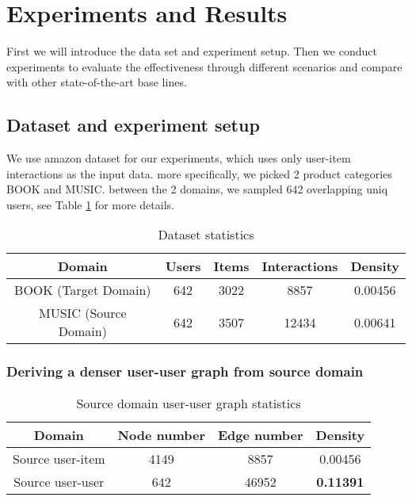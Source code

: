 \section{Experiments and Results}

First we will introduce the data set and experiment setup. Then we conduct experiments to evaluate the effectiveness through different scenarios and compare with other state-of-the-art base lines.


\subsection{Dataset and experiment setup}

We use amazon dataset for our experiments, which uses only user-item interactions as the input data.
more specifically, we picked 2 product categories BOOK and MUSIC.
between the 2 domains, we sampled 642 overlapping uniq users,  see Table \ref{tab:dataset} for more details.

\begin{table}[ht]
    \centering
    \begin{tabular}{|c|c|c|c|c|}
        \hline
        \textbf{Domain} & \textbf{Users} & \textbf{Items} & \textbf{Interactions} & \textbf{Density} \\ \hline
        BOOK (Target Domain)          & 642           & 3022         & 8857 & 0.00456               \\ \hline
        MUSIC (Source Domain)          & 642           & 3507         & 12434 & 0.00641             \\ \hline
    \end{tabular}
    \caption{Dataset statistics}
    \label{tab:dataset}
\end{table}

\subsubsection{Deriving a denser user-user graph from source domain}

\begin{table}[ht]
    \centering
    \begin{tabular}{|c|c|c|c|}
        \hline
        \textbf{Domain} & \textbf{Node number}  & \textbf{Edge number} & \textbf{Density} \\ \hline
        Source user-item       &  4149  & 8857 & 0.00456               \\ \hline
        Source user-user          & 642 & 46952 & \textbf{0.11391}             \\ \hline
    \end{tabular}
    \caption{Source domain user-user graph statistics}
    \label{tab:source-domain-user-user-graph}
\end{table}

